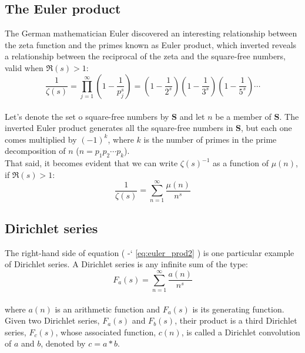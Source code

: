 \documentclass[12pt]{article}
\newcommand*{\eqrefe}[1]{%
\begingroup
(\color{BrickRed}
\romannumeral-`\x %
\setcitestyle{numbers}%
\ref{eq:#1}%
\endgroup
)\ignorespacesafterend
}
\begin{document}
\subsection{The Euler product}
The German mathematician Euler discovered an interesting relationship between the zeta function and the primes known as Euler product, which inverted reveals a relationship between the reciprocal of the zeta and the square-free numbers, valid when $\Re{(s)}>1$:
\begin{equation} \label{eq:euler_prod} \nonumber
\frac{1}{\zeta(s)}=\prod_{j=1}^{\infty} \left(1-\frac{1}{p_{j}^{s}}\right)
=\left(1-\frac{1}{2^{s}}\right)\left(1-\frac{1}{3^{s}}\right)\left(1-\frac{1}{5^{s}}\right)\cdots \text{}
\end{equation}\\
\indent Let's denote the set o square-free numbers by $\mathbf{S}$ and let $n$ be a member of $\mathbf{S}$. The inverted Euler product generates all the square-free numbers in $\mathbf{S}$, but each one comes multiplied by $(-1)^k$, where $k$ is the number of primes in the prime decomposition of $n$ ($n=p_{1}p_{2}\cdots p_{k}$).\\

That said, it becomes evident that we can write $\zeta(s)^{-1}$ as a function of $\mu(n)$, if $\Re{(s)}>1$:
\begin{equation} \label{eq:euler_prod2} 
\frac{1}{\zeta(s)}=\sum_{n=1}^{\infty}\frac{\mu(n)}{n^{s}}
\end{equation}

\subsection{Dirichlet series}
\indent The right-hand side of equation \eqrefe{euler_prod2} is one particular example of Dirichlet series. A Dirichlet series is any infinite sum of the type:
\begin{equation} \nonumber
F_a(s)=\sum_{n=1}^{\infty}\frac{a(n)}{n^{s}}
\end{equation}\\
\noindent where $a(n)$ is an arithmetic function and $F_a(s)$ is its generating function.\\

Given two Dirichlet series, $F_a(s)$ and $F_b(s)$, their product is a third Dirichlet series, $F_c(s)$, whose associated function, $c(n)$, is called a Dirichlet convolution of $a$ and $b$, denoted by $c=a*b$.\\
\end{document}
